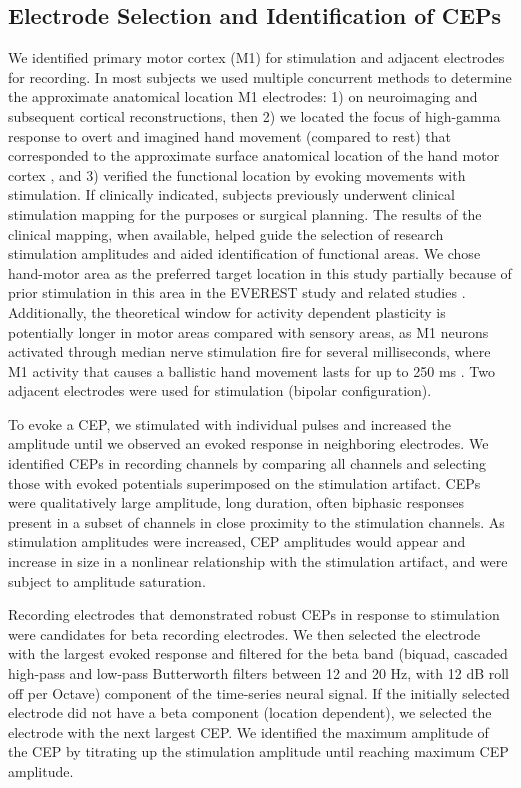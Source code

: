 \subsection{Electrode Selection and Identification of CEPs}
We identified primary motor cortex (M1) for stimulation and adjacent electrodes for recording. In most subjects we used multiple concurrent methods to determine the approximate anatomical location M1 electrodes: 1) on neuroimaging and subsequent cortical reconstructions, then  2) we located the focus of high-gamma response to overt and imagined hand movement (compared to rest) that corresponded to the approximate surface anatomical location of the hand motor cortex \cite{Leuthardt2004,Miller2007}, and 3) verified the functional location by evoking movements with stimulation. If clinically indicated, subjects previously underwent clinical stimulation mapping for the purposes or surgical planning. The results of the clinical mapping, when available, helped guide the selection of research stimulation amplitudes and aided identification of functional areas.  We chose hand-motor area as the preferred target location in this study partially because of prior stimulation in this area in the EVEREST study and related studies \cite{Levy2008,Huang2008a,Harvey2009,Plow2009}. Additionally, the theoretical window for activity dependent plasticity is potentially longer in motor areas compared with sensory areas, as M1 neurons activated through median nerve stimulation fire for several milliseconds, where M1 activity that causes a ballistic hand movement lasts for up to 250 ms \cite{Crammond2000,Edwardson2013}. Two adjacent electrodes were used for stimulation (bipolar configuration). 

To evoke a CEP, we stimulated with individual pulses and increased the amplitude until we observed an evoked response in neighboring electrodes. We identified CEPs in recording channels by comparing all channels and selecting those with evoked potentials superimposed on the stimulation artifact. CEPs were qualitatively large amplitude, long duration, often biphasic responses present in a subset of channels in close proximity to the stimulation channels. As stimulation amplitudes were increased, CEP amplitudes would appear and increase in size in a nonlinear relationship with the stimulation artifact, and were subject to amplitude saturation. 

Recording electrodes that demonstrated robust CEPs in response to stimulation were candidates for beta recording electrodes. We then selected the electrode with the largest evoked response and filtered for the beta band (biquad, cascaded high-pass and low-pass Butterworth filters between 12 and 20 Hz, with 12 dB roll off per Octave)  component of the time-series neural signal. If the initially selected electrode did not have a beta component (location dependent), we selected the electrode with the next largest CEP. We identified the maximum amplitude of the CEP by titrating up the stimulation amplitude until reaching maximum CEP amplitude.

